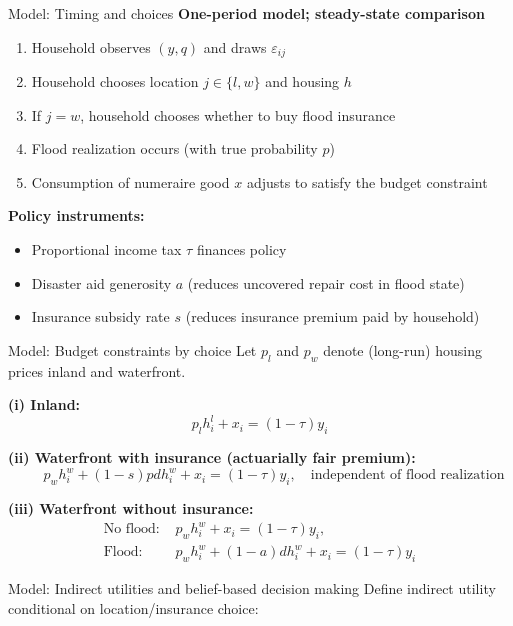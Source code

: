 \documentclass[xcolor=dvipsnames, aspectratio = 169]{beamer}
\begin{document}
{%
\begin{frame}{Model: Timing and choices}
\textbf{One-period model; steady-state comparison}\\
\begin{enumerate}[label=\arabic*.] 
  \item Household observes $(y,q)$ and draws $\varepsilon_{ij}$
  \item Household chooses location $j\in\{l,w\}$ and housing $h$
  \item If $j=w$, household chooses whether to buy flood insurance
  \item Flood realization occurs (with true probability $p$)
  \item Consumption of numeraire good $x$ adjusts to satisfy the budget constraint
\end{enumerate}
\vspace{0.4em}
\textbf{Policy instruments:}
\begin{itemize}
  \item Proportional income tax $\tau$ finances policy
  \item Disaster aid generosity $a$ (reduces uncovered repair cost in flood state)
  \item Insurance subsidy rate $s$ (reduces insurance premium paid by household)
\end{itemize}
\end{frame}

\begin{frame}{Model: Budget constraints by choice}
Let $p_l$ and $p_w$ denote (long-run) housing prices inland and waterfront.

\medskip
\textbf{(i) Inland:}
\[
p_l h_i^l + x_i = (1-\tau) y_i
\]

\textbf{(ii) Waterfront with insurance (actuarially fair premium):}
\[
\qquad p_w h_i^w + (1-s)p d h_i^w + x_i = (1-\tau) y_i, \quad \text{independent of flood realization}
\]

\textbf{(iii) Waterfront without insurance:}
\[
\begin{aligned}
\text{No flood: } & p_w h_i^w + x_i = (1-\tau)y_i,\\
\text{Flood: } & p_w h_i^w + (1-a)d h_i^w + x_i = (1-\tau) y_i
\end{aligned}
\]
\end{frame}

\begin{frame}{Model: Indirect utilities and belief-based decision making}
Define indirect utility conditional on location/insurance choice:


\end{frame}}
\end{document}
